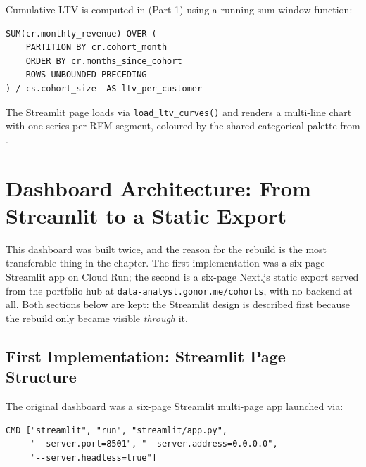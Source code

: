 Cumulative LTV is computed in  (Part 1)
using a running sum window function:

\begin{lstlisting}[style=sql, caption={Cumulative LTV per customer (from \filepath{sql/04\_ltv\_activation.sql})}]
SUM(cr.monthly_revenue) OVER (
    PARTITION BY cr.cohort_month
    ORDER BY cr.months_since_cohort
    ROWS UNBOUNDED PRECEDING
) / cs.cohort_size  AS ltv_per_customer
\end{lstlisting}

The Streamlit page loads  via
\texttt{load\_ltv\_curves()} and renders a multi-line chart with one series per
RFM segment, coloured by the shared categorical palette from
.

\section{Dashboard Architecture: From Streamlit to a Static Export}
\label{sec:ecom-streamlit}


This dashboard was built twice, and the reason for the rebuild is the most
transferable thing in the chapter. The first implementation was a six-page
Streamlit app on Cloud Run; the second is a six-page Next.js static export served
from the portfolio hub at \texttt{data-analyst.gonor.me/cohorts}, with no backend
at all. Both sections below are kept: the Streamlit design is described first
because the rebuild only became visible \emph{through} it.

\subsection{First Implementation: Streamlit Page Structure}

The original dashboard was a six-page Streamlit multi-page app launched via:
\begin{lstlisting}[style=dockerfile, caption={Run command (from \filepath{Dockerfile})}]
CMD ["streamlit", "run", "streamlit/app.py",
     "--server.port=8501", "--server.address=0.0.0.0",
     "--server.headless=true"]
\end{lstlisting}

